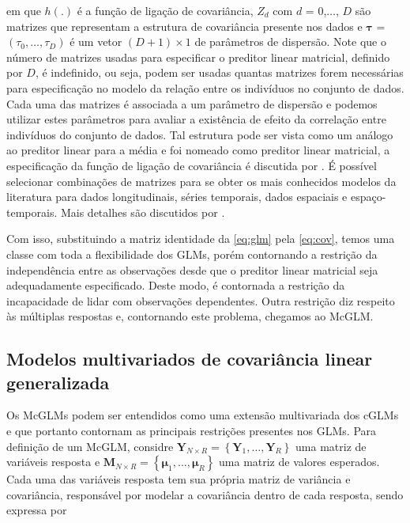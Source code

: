 \noindent em que $h(.)$ é a função de ligação de covariância, $Z_d$ com $d$ = 0,$\ldots$, $D$ são matrizes que representam a estrutura de covariância presente nos dados e $\boldsymbol{\tau}$ = $(\tau_0, \ldots, \tau_D)$ é um vetor $(D + 1) \times 1$ de parâmetros de dispersão. Note que o número de matrizes usadas para especificar o preditor linear matricial, definido por $D$, é indefinido, ou seja, podem ser usadas quantas matrizes forem necessárias para especificação no modelo da relação entre os indivíduos no conjunto de dados. Cada uma das matrizes é associada a um parâmetro de dispersão e podemos utilizar estes parâmetros para avaliar a existência de efeito da correlação entre indivíduos do conjunto de dados. Tal estrutura pode ser vista como um análogo ao preditor linear para a média e foi nomeado como preditor linear matricial, a especificação da função de ligação de covariância é discutida por \citet{Pinheiro96}. É possível selecionar combinações de matrizes para se obter os mais conhecidos modelos da literatura para dados longitudinais, séries temporais, dados espaciais e espaço-temporais. Mais detalhes são discutidos por \citet{Demidenko13}.

Com isso, substituindo a matriz identidade da \autoref{eq:glm} pela \autoref{eq:cov}, temos uma classe com toda a flexibilidade dos GLMs, porém contornando a restrição da independência entre as observações desde que o preditor linear matricial seja adequadamente especificado. Deste modo, é contornada a restrição da incapacidade de lidar com observações dependentes. Outra restrição diz respeito às múltiplas respostas e, contornando este problema, chegamos ao McGLM.

\subsection{Modelos multivariados de covariância linear generalizada}

Os McGLMs podem ser entendidos como uma extensão multivariada dos cGLMs e que portanto contornam as principais restrições presentes nos GLMs. Para definição de um McGLM, considre $\boldsymbol{Y}_{N \times
R} = \left \{ \boldsymbol{Y}_1, \dots, \boldsymbol{Y}_R \right \}$ uma  matriz de variáveis resposta e $\boldsymbol{M}_{N \times R} = \left \{ \boldsymbol{\mu}_1, \dots, \boldsymbol{\mu}_R \right \}$ uma matriz de valores esperados. Cada uma das variáveis resposta tem sua própria matriz de variância e covariância, responsável por modelar a covariância dentro de cada resposta, sendo expressa por

